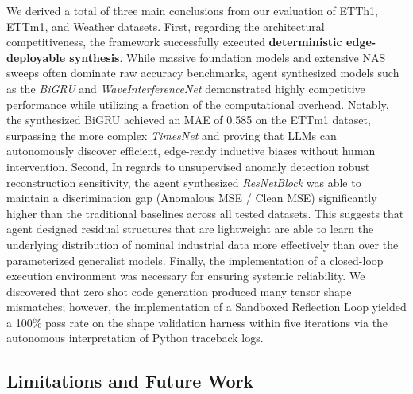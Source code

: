\documentclass{article}
\begin{document}
We derived a total of three main conclusions from our evaluation of ETTh1, ETTm1, and Weather datasets. First, regarding the architectural competitiveness, the framework successfully executed \textbf{deterministic edge-deployable synthesis}. While massive foundation models and extensive NAS sweeps often dominate raw accuracy benchmarks, agent synthesized models such as the \textit{BiGRU} and \textit{WaveInterferenceNet} demonstrated highly competitive performance while utilizing a fraction of the computational overhead. Notably, the synthesized BiGRU achieved an MAE of 0.585 on the ETTm1 dataset, surpassing the more complex \textit{TimesNet} \cite{wu2022timesnet} and proving that LLMs can autonomously discover efficient, edge-ready inductive biases without human intervention. Second, In regards to unsupervised anomaly detection robust reconstruction sensitivity, the agent synthesized \textit{ResNetBlock} was able to maintain a discrimination gap (Anomalous MSE / Clean MSE) significantly higher than the traditional baselines across all tested datasets. This suggests that agent designed residual structures that are lightweight are able to learn the underlying distribution of nominal industrial data more effectively than over the parameterized generalist models. Finally, the implementation of a closed-loop execution environment was necessary for ensuring systemic reliability. We discovered that zero shot code generation produced many tensor shape mismatches; however, the implementation of a Sandboxed Reflection Loop yielded a 100\% pass rate on the shape validation harness within five iterations via the autonomous interpretation of Python traceback logs.


 

\subsection{Limitations and Future Work}
\end{document}
